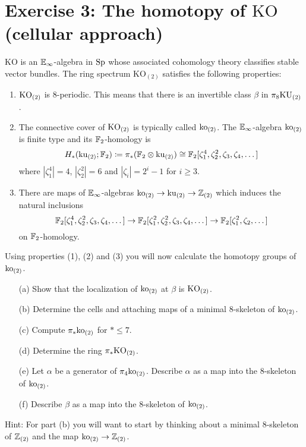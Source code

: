 \documentclass[reqno]{amsart}
\begin{document}
\section{\bf Exercise 3: The homotopy of $\mathrm{KO}$ (cellular approach)}

$\mathrm{KO}$ is an $\mathbb{E}_\infty$-algebra in $\mathrm{Sp}$ whose associated cohomology theory
classifies stable vector bundles.
The ring spectrum $\mathrm{KO}_{(2)}$ satisfies the following properties:

\begin{enumerate}
\item $\mathrm{KO}_{(2)}$ is $8$-periodic.
  This means that there is an invertible class $\beta$ in $\pi_8\mathrm{KU}_{(2)}$.
\item The connective cover of $\mathrm{KO}_{(2)}$ is typically called $\mathrm{ko}_{(2)}$.
  The $\mathbb{E}_\infty$-algebra $\mathrm{ko}_{(2)}$ is finite type and 
  its $\mathbb{F}_2$-homology is
  \[ H_*(\mathrm{ku}_{(2)}; \mathbb{F}_2) \coloneqq \pi_*(\mathbb{F}_2 \otimes \mathrm{ku}_{(2)}) \cong \mathbb{F}_2[\zeta_1^{4}, \zeta_2^{2}, \zeta_3, \zeta_4, \dots ] \]
  where
  $|\zeta_1^{4}| = 4$,
  $|\zeta_2^{2}| = 6$
  and $|\zeta_i| = 2^{i} - 1$ for $i \geq 3$.
\item There are maps of $\mathbb{E}_\infty$-algebras
  $\mathrm{ko}_{(2)} \to \mathrm{ku}_{(2)} \to \mathbb{Z}_{(2)}$ which induces the natural inclusions
  \[ \mathbb{F}_2[\zeta_1^{4}, \zeta_2^{2}, \zeta_3, \zeta_4, \dots ] \to \mathbb{F}_2[\zeta_1^{2}, \zeta_2^{2}, \zeta_3, \zeta_4, \dots ] \to \mathbb{F}_2[\zeta_1^2, \zeta_2, \dots] \]
  on $\mathbb{F}_2$-homology.
\end{enumerate}

Using properties (1), (2) and (3) you will now calculate the homotopy groups of $\mathrm{ko}_{(2)}$.

\begin{enumerate}
\item[(a)] Show that the localization of $\mathrm{ko}_{(2)}$ at $\beta$ is $\mathrm{KO}_{(2)}$.
\item[(b)] Determine the cells and attaching maps of a minimal $8$-skeleton of $\mathrm{ko}_{(2)}$.
\item[(c)] Compute $\pi_*\mathrm{ko}_{(2)}$ for $* \leq 7$.
\item[(d)] Determine the ring $\pi_*\mathrm{KO}_{(2)}$.
\item[(e)] Let $\alpha$ be a generator of $\pi_4\mathrm{ko}_{(2)}$.
  Describe $\alpha$ as a map into the $8$-skeleton of $\mathrm{ko}_{(2)}$.
\item[(f)] Describe $\beta$ as a map into the $8$-skeleton of $\mathrm{ko}_{(2)}$.
\end{enumerate}

Hint: For part (b) you will want to start by thinking about a minimal $8$-skeleton of $\mathbb{Z}_{(2)}$ and the map $\mathrm{ko}_{(2)} \to \mathbb{Z}_{(2)}$.
\end{document}
